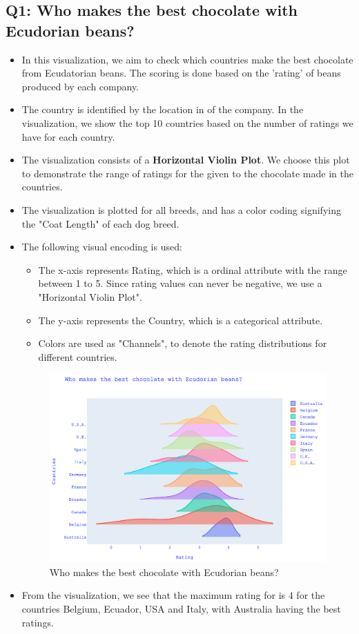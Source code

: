 \documentclass[a4paper]{article}
\begin{document}
\subsection{Q1: Who makes the best chocolate with Ecudorian beans?}
\begin{itemize}
    \item In this visualization, we aim to check which countries make the best chocolate from Ecudatorian beans. The scoring is done based on the 'rating' of beans produced by each company.
    \item The country is identified by the location in of the company. In the visualization, we show the top 10 countries based on the number of ratings we have for each country.
    \item The visualization consists of a \textbf{Horizontal Violin Plot}. We choose this plot to demonstrate the range of ratings for the given to the chocolate made in the countries.
    \item The visualization is plotted for all breeds, and has a color coding signifying the "Coat Length" of each dog breed.
    \item The following visual encoding is used:
    \begin{itemize}
        \item The x-axis represents Rating, which is a ordinal attribute with the range between 1 to 5. Since rating values can never be negative, we use a "Horizontal Violin Plot".
        \item The y-axis represents the Country, which is a categorical attribute.
        \item Colors are used as "Channels", to denote the rating distributions for different countries.
    \end{itemize}
    \begin{figure}[H]
        \centering
        \includegraphics[width=1.0\textwidth]{violin}
        \caption{Who makes the best chocolate with Ecudorian beans?}
        \label{fig:violin}
    \end{figure}
    \item From the visualization, we see that the maximum rating for is 4 for the countries Belgium, Ecuador, USA and Italy, with Australia having the best ratings. 
\end{itemize}
\end{document}
